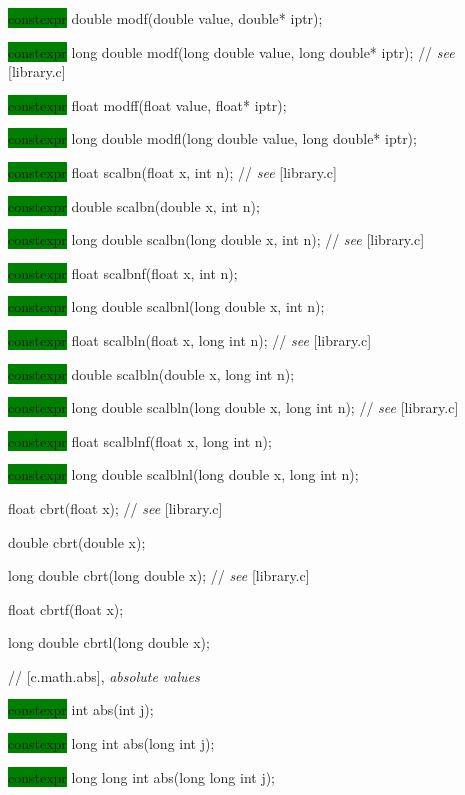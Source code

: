 \documentclass[prd,twocolumn,amsmath,amssymb,nofootinbib,eqsecnum]{revtex4-1}
\newcommand{\highlight}[1]{\colorbox{green}{\!\!\!\! #1}}
\newcommand{\stdcomment}[1]{{// {\it see} [#1]}}
\begin{document}
{\highlight{constexpr}  double modf(double value, double* iptr);

\highlight{constexpr}  long double modf(long double value, long double* iptr); \stdcomment{library.c}

\highlight{constexpr}  float modff(float value, float* iptr);

\highlight{constexpr}  long double modfl(long double value, long double* iptr);

\vspace{2ex}

\highlight{constexpr} float scalbn(float x, int n); \stdcomment{library.c}

\highlight{constexpr} double scalbn(double x, int n);

\highlight{constexpr} long double scalbn(long double x, int n); \stdcomment{library.c}

\highlight{constexpr} float scalbnf(float x, int n);

\highlight{constexpr} long double scalbnl(long double x, int n);

\vspace{2ex}

\highlight{constexpr} float scalbln(float x, long int n); \stdcomment{library.c}

\highlight{constexpr} double scalbln(double x, long int n);

\highlight{constexpr} long double scalbln(long double x, long int n); \stdcomment{library.c}

\highlight{constexpr} float scalblnf(float x, long int n);

\highlight{constexpr} long double scalblnl(long double x, long int n);

\vspace{2ex}

float cbrt(float x); \stdcomment{library.c}

double cbrt(double x);

long double cbrt(long double x); \stdcomment{library.c}

float cbrtf(float x);

long double cbrtl(long double x);

\vspace{2ex}

//  [c.math.abs], {\it absolute values}

\highlight{constexpr} int abs(int j);

\highlight{constexpr} long int abs(long int j);

\highlight{constexpr} long long int abs(long long int j);

}
\end{document}
